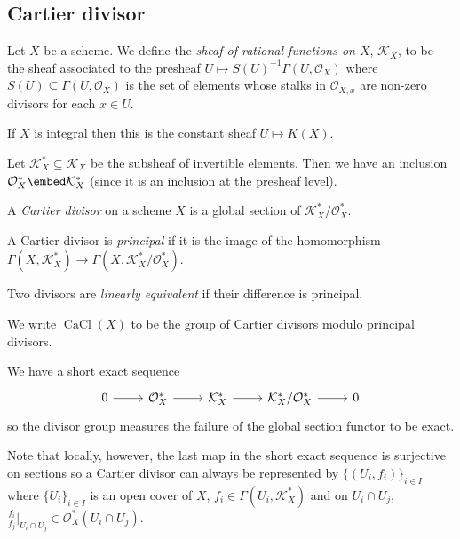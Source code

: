 \documentclass[a4paper]{article}
\newcommand{\sh}[1]{\mathcal{#1}} %
\DeclareMathOperator{\CaCl}{CaCl} %
\begin{document}
\subsection{Cartier divisor}

\begin{definition}
  Let \(X\) be a scheme. We define the \emph{sheaf of rational functions on \(X\)}, \(\sh K_X\), to be the sheaf associated to the presheaf \(U \mapsto S(U)^{-1} \Gamma(U, \sh O_X)\) where \(S(U) \subseteq \Gamma(U, \sh O_X)\) is the set of elements whose stalks in \(\sh O_{X, x}\) are non-zero divisors for each \(x \in U\).
\end{definition}

\begin{remark}
  If \(X\) is integral then this is the constant sheaf \(U \mapsto K(X)\).
\end{remark}

Let \(\sh K_X^* \subseteq \sh K_X\) be the subsheaf of invertible elements. Then we have an inclusion \(\sh O_X^* \embed \sh K_X^*\) (since it is an inclusion at the presheaf level).

\begin{definition}
  A \emph{Cartier divisor} on a scheme \(X\) is a global section of \(\sh K_X^*/\sh O_X^*\).

  A Cartier divisor is \emph{principal} if it is the image of the homomorphism \(\Gamma(X, \sh K_X^*) \to \Gamma(X, \sh K_X^*/\sh O_X^*)\).

  Two divisors are \emph{linearly equivalent} if their difference is principal.

  We write \(\CaCl(X)\) to be the group of Cartier divisors modulo principal divisors.
\end{definition}

\begin{remark}
  We have a short exact sequence
  \[
    \begin{tikzcd}
      0 \ar[r] & \sh O_X^* \ar[r] & \sh K_X^* \ar[r] & \sh K_X^*/\sh O_X^* \ar[r] & 0
    \end{tikzcd}
  \]
  so the divisor group measures the failure of the global section functor to be exact.
\end{remark}

Note that locally, however, the last map in the short exact sequence is surjective on sections so a Cartier divisor can always be represented by \(\{(U_i, f_i)\}_{i \in I}\) where \(\{U_i\}_{i \in I}\) is an open cover of \(X\), \(f_i \in \Gamma(U_i, \sh K_X^*)\) and on \(U_i \cap U_j\), \(\frac{f_i}{f_j}|_{U_i \cap U_j} \in \sh O_X^*(U_i \cap U_j)\).
\end{document}
